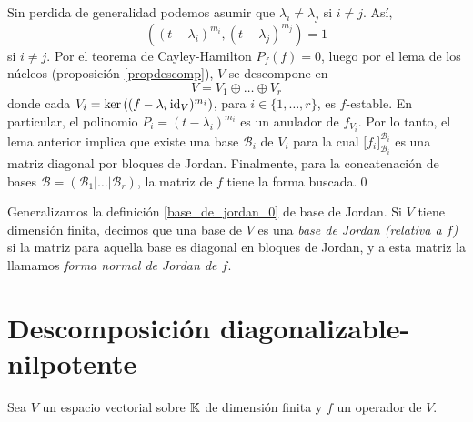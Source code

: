 \dem Sin perdida de generalidad podemos asumir que $\lambda_i\ne\lambda_j$ si $i\ne j$. As\'i,
\[
\left( (t-\lambda_i)^{m_i},(t-\lambda_j)^{m_j}\right)=1
\]
si $i\ne j$. Por el teorema de Cayley-Hamilton $P_f(f)=0$, luego por el lema de los núcleos (proposición \ref{propdescomp}), $V$ se descompone en
\[
V=V_1\oplus \ldots \oplus V_r
\]
donde cada $V_i=\ker\left((f-\lambda_i\operatorname{id}_V)^{m_i}\right)$, para $i\in\{1,\ldots,r\}$, es $f$-estable. En particular, el polinomio $P_i=(t-\lambda_i)^{m_i}$ es un anulador de $f_{V_i}$. Por lo tanto, el lema anterior implica que existe una base $\mathcal{B}_i$ de $V_i$ para la cual $\Big[f_i\Big]^{\mathcal{B}_i}_{\mathcal{B}_i}$ es una matriz diagonal por bloques de Jordan. Finalmente, para la concatenación de bases $\mathcal{B}=(\mathcal{B}_1|\ldots|\mathcal{B}_r)$, la matriz de $f$ tiene la forma buscada.\qed

\begin{defn}\label{base_de_jordan}
Generalizamos la definici\'on \ref{base_de_jordan_0} de base de Jordan. Si $V$ tiene dimensi\'on finita, decimos que una base de $V$ es una \emph{base de Jordan (relativa a $f$)} si la matriz para aquella base es diagonal en bloques de Jordan, y a esta matriz la llamamos \emph{forma normal de Jordan de $f$}.
\end{defn}

\section{Descomposición diagonalizable-nilpotente}

Sea $V$ un espacio vectorial sobre $\mathbb{K}$ de dimensión finita y $f$ un operador de $V$.

